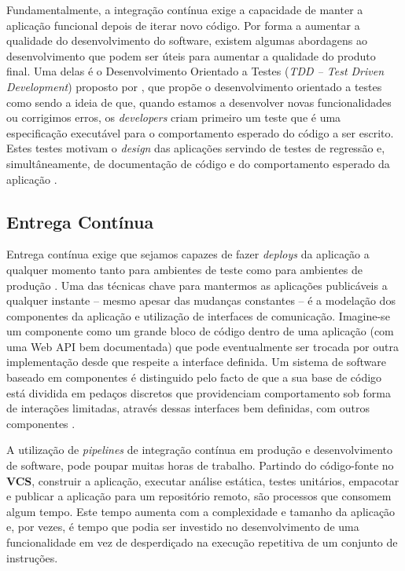 \hspace{1cm}Fundamentalmente, a integração contínua exige a capacidade de manter a aplicação funcional depois de iterar novo código. Por forma a aumentar a qualidade do desenvolvimento do software, existem algumas abordagens ao desenvolvimento que podem ser úteis para aumentar a qualidade do produto final. Uma delas é o Desenvolvimento Orientado a Testes (\textit{TDD -- Test Driven Development}) proposto por , que propõe o desenvolvimento orientado a testes como sendo a ideia de que, quando estamos a desenvolver novas funcionalidades ou corrigimos erros, os \textit{developers} criam primeiro um teste que é uma especificação executável para o comportamento esperado do código a ser escrito. Estes testes motivam o \textit{design} das aplicações servindo de testes de regressão e, simultâneamente, de documentação de código e do comportamento esperado da aplicação \cite{farley2010contdel}.

\subsection{Entrega Contínua}

\hspace{1cm}Entrega contínua exige que sejamos capazes de fazer \textit{deploys} da aplicação a qualquer momento tanto para ambientes de teste como para ambientes de produção \cite{farley2010contdel}. Uma das técnicas chave para mantermos as aplicações publicáveis a qualquer instante -- mesmo apesar das mudanças constantes -- é a modelação dos componentes da aplicação e utilização de interfaces de comunicação. Imagine-se um componente como um grande bloco de código dentro de uma aplicação (com uma Web API bem documentada) que pode eventualmente ser trocada por outra implementação desde que respeite a interface definida. Um sistema de software baseado em componentes é distinguido pelo facto de que a sua base de código está dividida em pedaços discretos que providenciam comportamento sob forma de interações limitadas, através dessas interfaces bem definidas, com outros componentes \cite{farley2010contdel}.

\hspace{1cm}A utilização de \textit{pipelines} de integração contínua em produção e desenvolvimento de software, pode poupar muitas horas de trabalho. Partindo do  código-fonte no \textbf{VCS}, construir a aplicação, executar análise estática, testes unitários, empacotar e publicar a aplicação para um repositório remoto, são processos que consomem algum tempo. Este tempo aumenta com a complexidade e tamanho da aplicação e, por vezes, é tempo que podia ser investido no desenvolvimento de uma funcionalidade em vez de desperdiçado na execução repetitiva de um conjunto de instruções. 

